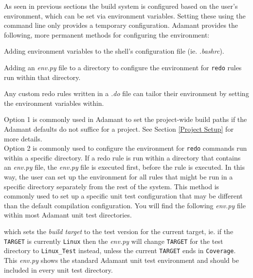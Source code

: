 As seen in previous sections  the build system is configured based on the user's environment, which can be set via environment variables. Setting these using the command line only provides a temporary configuration. Adamant provides the following, more permanent methods for configuring the environment:

\vspace{5mm} %
\begin{spacedenumerate}
  \item Adding environment variables to the shell's configuration file (ie. \textit{.bashrc}).
  \item Adding an \textit{env.py} file to a directory to configure the environment for \texttt{redo} rules run within that directory.
  \item Any custom redo rules written in a \textit{.do} file can tailor their environment by setting the environment variables within.
\end{spacedenumerate}
\vspace{5mm} %

Option 1 is commonly used in Adamant to set the project-wide build paths if the Adamant defaults do not suffice for a project. See Section \ref{Project Setup} for more details. \\

Option 2 is commonly used to configure the environment for \texttt{redo} commands run within a specific directory. If a redo rule is run within a directory that contains an \textit{env.py} file, the \textit{env.py} file is executed first, before the rule is executed. In this way, the user can set up the environment for all rules that might be run in a specific directory separately from the rest of the system. This method is commonly used to set up a specific unit test configuration that may be different than the default compilation configuration. You will find the following \textit{env.py} file within most Adamant unit test directories.


which sets the \textit{build target} to the test version for the current target, ie. if the \texttt{TARGET} is currently \texttt{Linux} then the \textit{env.py} will change \texttt{TARGET} for the test directory to \texttt{Linux\_Test} instead, unless the current \texttt{TARGET} ends in \texttt{Coverage}. This \textit{env.py} shows the standard Adamant unit test environment and should be included in every unit test directory. \\

